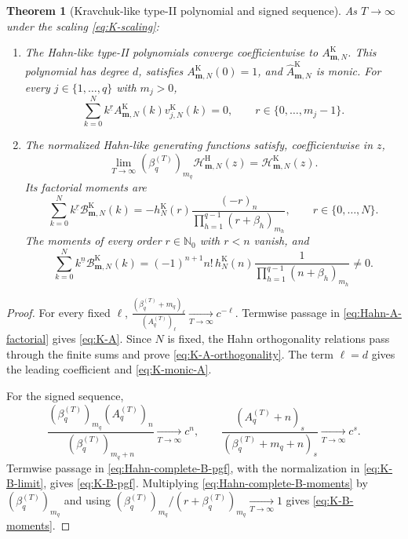 \documentclass[10pt]{amsart}
\newcommand{\Nzero}{\mathbb N_0}
\newcommand{\mm}{\boldsymbol m}
\newcommand{\fall}[2]{#1^{\underline{#2}}}
\theoremstyle{plain}
\newtheorem{theorem}{Theorem}[section]
\theoremstyle{definition}
\theoremstyle{remark}
\begin{document}
\begin{theorem}[Kravchuk-like type-II polynomial and signed sequence]
\label{thm:K-forms}
As \(T\to\infty\) under the scaling \eqref{eq:K-scaling}:
\begin{enumerate}[label=\textup{(\roman*)}]
\item The Hahn-like type-II polynomials converge coefficientwise to
\(A_{\mm,N}^{\mathrm K}\). This polynomial has degree \(d\), satisfies
\(A_{\mm,N}^{\mathrm K}(0)=1\), and \(\widehat
A_{\mm,N}^{\mathrm K}\) is monic. For every
\(j\in\{1,\ldots,q\}\) with \(m_j>0\),
\begin{equation}
 \sum_{k=0}^N\fall{k}{r}
 A_{\mm,N}^{\mathrm K}(k)v_{j,N}^{\mathrm K}(k)=0,
 \qquad r\in\{0,\ldots,m_j-1\}.
 \label{eq:K-A-orthogonality}
\end{equation}
\item The normalized Hahn-like generating functions satisfy, coefficientwise
in \(z\),
\begin{equation}
 \lim_{T\to\infty}
 (\beta_q^{(T)})_{m_q}
 \mathcal H_{\mm,N}^{\mathrm H}(z)
 =\mathcal H_{\mm,N}^{\mathrm K}(z).
 \label{eq:K-B-limit}
\end{equation}
Its factorial moments are
\begin{equation}
 \sum_{k=0}^N\fall{k}{r}
 \mathcal B_{\mm,N}^{\mathrm K}(k)
 =
 -h_N^{\mathrm K}(r)
 \frac{(-r)_n}
 {\prod_{h=1}^{q-1}(r+\beta_h)_{m_h}},
 \qquad r\in\{0,\ldots,N\}.
 \label{eq:K-B-moments}
\end{equation}
The moments of every order \(r\in\Nzero\) with \(r<n\) vanish, and
\begin{equation}
 \sum_{k=0}^N\fall{k}{n}
 \mathcal B_{\mm,N}^{\mathrm K}(k)
 =
 (-1)^{n+1}n!\,h_N^{\mathrm K}(n)
 \frac{1}{\prod_{h=1}^{q-1}(n+\beta_h)_{m_h}}
 \ne0.
 \label{eq:K-B-leading-moment}
\end{equation}
\end{enumerate}
\end{theorem}

\begin{proof}
For every fixed \(\ell\),
\(\frac{(\beta_q^{(T)}+m_q)_\ell}{(A_q^{(T)})_\ell}
\xrightarrow[T\to\infty]{} c^{-\ell}\).
Termwise passage in \eqref{eq:Hahn-A-factorial} gives \eqref{eq:K-A}.
Since \(N\) is fixed, the Hahn orthogonality relations pass through the
finite sums and prove \eqref{eq:K-A-orthogonality}. The term \(\ell=d\)
gives the leading coefficient and \eqref{eq:K-monic-A}.

For the signed sequence,
\[
 \frac{(\beta_q^{(T)})_{m_q}(A_q^{(T)})_n}
 {(\beta_q^{(T)})_{m_q+n}}
 \xrightarrow[T\to\infty]{} c^n,
 \qquad
 \frac{(A_q^{(T)}+n)_s}
 {(\beta_q^{(T)}+m_q+n)_s}
 \xrightarrow[T\to\infty]{} c^s.
\]
Termwise passage in \eqref{eq:Hahn-complete-B-pgf}, with the normalization
in \eqref{eq:K-B-limit}, gives \eqref{eq:K-B-pgf}. Multiplying
\eqref{eq:Hahn-complete-B-moments} by
\((\beta_q^{(T)})_{m_q}\) and using
\((\beta_q^{(T)})_{m_q}/(r+\beta_q^{(T)})_{m_q}
\xrightarrow[T\to\infty]{}1\)
gives \eqref{eq:K-B-moments}.
\end{proof}
\end{document}
